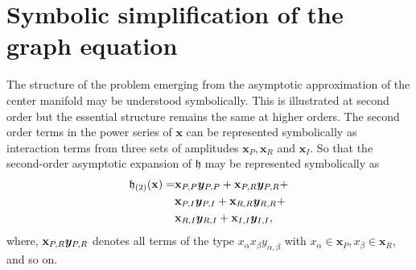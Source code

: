 \appendix



\section{Symbolic simplification of the graph equation}
\label{app:AppendixA}

The structure of the problem emerging from the asymptotic approximation of the center manifold may be understood symbolically. This is illustrated at second order but the essential structure remains the same at higher orders. The second order terms in the power series of $\mathbf{x}$ can be represented symbolically as interaction terms from three sets of amplitudes $\mathbf{x}_{P}, \mathbf{x}_{R}$ and $\mathbf{x}_{I}$. So that the second-order asymptotic expansion of $\mathfrak{h}$ may be represented symbolically as
\begin{align}
	\label{eqn:H2_symbolic}
	\begin{split}
		\mathfrak{h}_{(2)}(\mathbf{x}) =
		& \mathbf{x}_{P,P}\boldsymbol{y}_{P,P} + 
		    \mathbf{x}_{P,R}\boldsymbol{y}_{P,R} + \\  
		& \mathbf{x}_{P,I}\boldsymbol{y}_{P,I} + 
		    \mathbf{x}_{R,R}\boldsymbol{y}_{R,R} + \\
		& \mathbf{x}_{R,I}\boldsymbol{y}_{R,I} + 
		    \mathbf{x}_{I,I}\boldsymbol{y}_{I,I},
	\end{split}
\end{align}
where, $\mathbf{x}_{P,R}\boldsymbol{y}_{P,R}$ denotes all terms of the type $x_{\alpha}x_{\beta}y_{\alpha,\beta}$ with $x_{\alpha}\in \mathbf{x}_{P}, x_{\beta}\in \mathbf{x}_{R}$, and so on.

